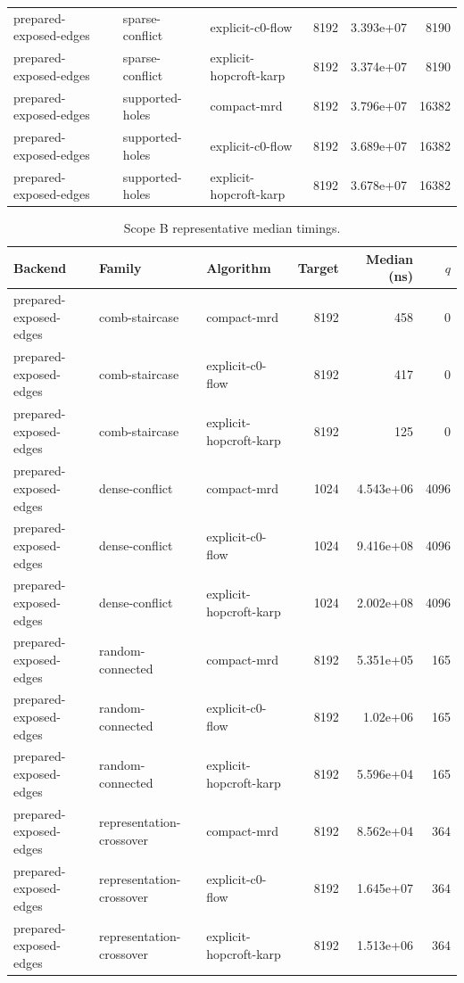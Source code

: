 \begin{table}[t]
\begin{tabular}{lllrrr}
prepared-exposed-edges & sparse-conflict & explicit-c0-flow & 8192 & 3.393e+07 & 8190 \\
prepared-exposed-edges & sparse-conflict & explicit-hopcroft-karp & 8192 & 3.374e+07 & 8190 \\
prepared-exposed-edges & supported-holes & compact-mrd & 8192 & 3.796e+07 & 16382 \\
prepared-exposed-edges & supported-holes & explicit-c0-flow & 8192 & 3.689e+07 & 16382 \\
prepared-exposed-edges & supported-holes & explicit-hopcroft-karp & 8192 & 3.678e+07 & 16382 \\
\bottomrule
\end{tabular}
\end{table}

\begin{table}[t]
\caption{Scope B representative median timings.}
\label{tab:kernel-scope-b}
\begin{tabular}{lllrrr}
\toprule
Backend & Family & Algorithm & Target & Median (ns) & $q$ \\
\midrule
prepared-exposed-edges & comb-staircase & compact-mrd & 8192 & 458 & 0 \\
prepared-exposed-edges & comb-staircase & explicit-c0-flow & 8192 & 417 & 0 \\
prepared-exposed-edges & comb-staircase & explicit-hopcroft-karp & 8192 & 125 & 0 \\
prepared-exposed-edges & dense-conflict & compact-mrd & 1024 & 4.543e+06 & 4096 \\
prepared-exposed-edges & dense-conflict & explicit-c0-flow & 1024 & 9.416e+08 & 4096 \\
prepared-exposed-edges & dense-conflict & explicit-hopcroft-karp & 1024 & 2.002e+08 & 4096 \\
prepared-exposed-edges & random-connected & compact-mrd & 8192 & 5.351e+05 & 165 \\
prepared-exposed-edges & random-connected & explicit-c0-flow & 8192 & 1.02e+06 & 165 \\
prepared-exposed-edges & random-connected & explicit-hopcroft-karp & 8192 & 5.596e+04 & 165 \\
prepared-exposed-edges & representation-crossover & compact-mrd & 8192 & 8.562e+04 & 364 \\
prepared-exposed-edges & representation-crossover & explicit-c0-flow & 8192 & 1.645e+07 & 364 \\
prepared-exposed-edges & representation-crossover & explicit-hopcroft-karp & 8192 & 1.513e+06 & 364 \\

\end{tabular}
\end{table}
